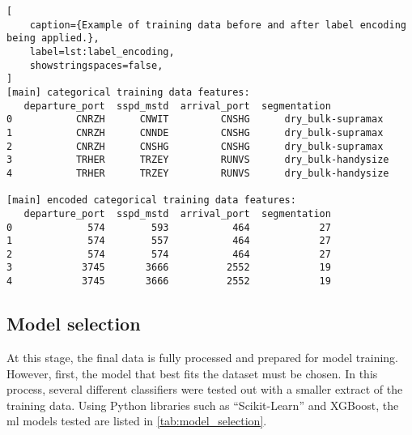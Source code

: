 \begin{lstlisting}[
    caption={Example of training data before and after label encoding being applied.},
    label=lst:label_encoding,
    showstringspaces=false,
]
[main] categorical training data features:
   departure_port  sspd_mstd  arrival_port  segmentation
0           CNRZH      CNWIT         CNSHG      dry_bulk-supramax
1           CNRZH      CNNDE         CNSHG      dry_bulk-supramax
2           CNRZH      CNSHG         CNSHG      dry_bulk-supramax
3           TRHER      TRZEY         RUNVS      dry_bulk-handysize
4           TRHER      TRZEY         RUNVS      dry_bulk-handysize

[main] encoded categorical training data features:
   departure_port  sspd_mstd  arrival_port  segmentation
0             574        593           464            27
1             574        557           464            27
2             574        574           464            27
3            3745       3666          2552            19
4            3745       3666          2552            19
\end{lstlisting}


\subsection{Model selection}

At this stage, the final data is fully processed and prepared for model training. However, first, the model that best fits the dataset must be chosen. In this process, several different classifiers were tested out with a smaller extract of the training data. Using Python libraries such as ``Scikit-Learn'' and XGBoost, the \acrshort{ml} models tested are listed in \cref{tab:model_selection}.

